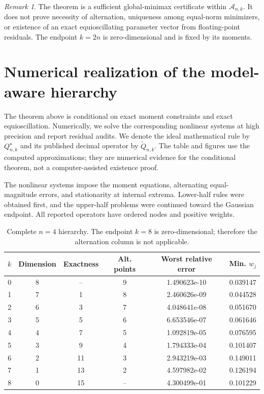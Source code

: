 \documentclass[preprint,12pt]{elsarticle}
\theoremstyle{remark}
\newtheorem{remark}[theorem]{Remark}
\begin{document}
\begin{remark}
The theorem is a sufficient global-minimax certificate within
\(\mathcal A_{n,k}\). It does not prove necessity of alternation,
uniqueness among equal-norm minimizers, or existence of an exact
equioscillating parameter vector from floating-point residuals. The
endpoint \(k=2n\) is zero-dimensional and is fixed by its moments.
\end{remark}


\section{Numerical realization of the model-aware hierarchy}

The theorem above is conditional on exact moment
constraints and exact equioscillation. Numerically, we solve the
corresponding nonlinear systems at high precision and report residual
audits. We denote the ideal mathematical rule by \(Q_{n,k}^\star\) and
its published decimal operator by \(\widetilde Q_{n,k}\). The table and
figures use the computed approximations; they are numerical evidence
for the conditional theorem, not a computer-assisted existence proof.

The nonlinear systems impose the moment equations, alternating
equal-magnitude errors, and stationarity at internal extrema. Lower-half rules were obtained first, and the upper-half
problems were continued toward the Gaussian endpoint. All reported
operators have ordered nodes and positive weights.

\begin{table}[ht]
\centering
\caption{Complete \(n=4\) hierarchy. The endpoint \(k=8\) is
zero-dimensional; therefore the alternation column is not applicable.}
\label{tab:full-hierarchy}
\small
\begin{tabular}{cccccc}
\toprule
\(k\) & Dimension & Exactness & Alt. points &
Worst relative error & Min. \(w_j\)\\
\midrule
0 & 8 & -- & 9 & 1.490623e-10 & 0.039147 \\
1 & 7 & 1 & 8 & 2.460626e-09 & 0.044528 \\
2 & 6 & 3 & 7 & 4.048641e-08 & 0.051670 \\
3 & 5 & 5 & 6 & 6.653546e-07 & 0.061646 \\
4 & 4 & 7 & 5 & 1.092819e-05 & 0.076595 \\
5 & 3 & 9 & 4 & 1.794333e-04 & 0.101407 \\
6 & 2 & 11 & 3 & 2.943219e-03 & 0.149011 \\
7 & 1 & 13 & 2 & 4.597982e-02 & 0.126194 \\
8 & 0 & 15 & -- & 4.300499e-01 & 0.101229 \\
\bottomrule
\end{tabular}
\end{table}
\end{document}
